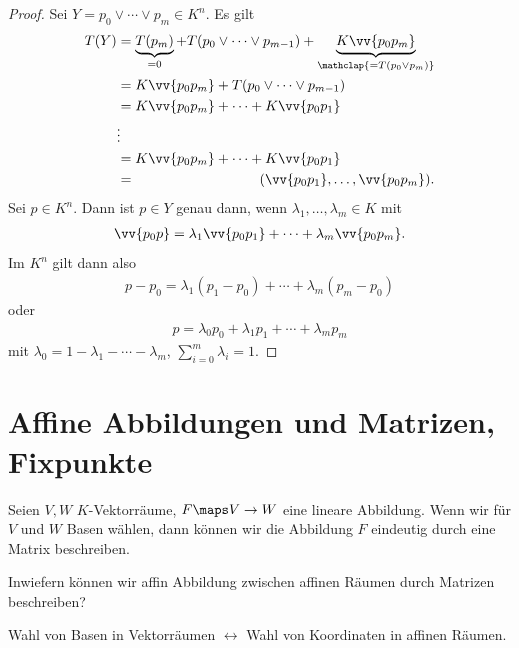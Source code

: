 \begin{proof}
    Sei \( Y=p_0 \vee\dotsb\vee p_m\in K^n \). Es gilt
    \begin{align*}
        T(Y)\begin{aligned}[t]
            &=\underbrace{T(p_m)}_{=0}+T(p_0\vee \dotsb \vee p_{m-1})+\underbrace{K\vv{p_0 p_m}}_{\mathclap{=T(p_0\vee p_m)}}\\
            &=K\vv{p_0 p_m}+T(p_0\vee \dotsb\vee p_{m-1})\\
            &=K\vv{p_0 p_m}+\dotsb +K\vv{p_0 p_1}\\
            &\vdots\\
            &=K\vv{p_0 p_m}+\dotsb + K\vv{p_0 p_1}\\
            &=\span(\vv{p_0 p_1}, \dotsc, \vv{p_0 p_m}).
        \end{aligned}
    \end{align*}
    Sei \( p\in K^n \). Dann ist \( p\in Y \) genau dann, wenn \texists \( \lambda_1,\dotsc,\lambda_m\in K \) mit
    \begin{align*}
        \vv{p_0 p}=\lambda_1 \vv{p_0 p_1}+\dotsb+\lambda_m\vv{p_0 p_m}.
    \end{align*}
    Im \( K^n \) gilt dann also
    \begin{align*}
        p-p_0=\lambda_1(p_1-p_0)+\dotsb + \lambda_m(p_m-p_0)
    \end{align*}
    oder 
    \begin{align*}
        p=\lambda_0 p_0+\lambda_1 p_1+\dotsb+\lambda_m p_m
    \end{align*}
    mit \( \lambda_0=1-\lambda_1-\dotsb-\lambda_m \), \dh \( \sum\limits_{i=0}^{m}\lambda_i=1 \).
\end{proof}
\section{Affine Abbildungen und Matrizen, Fixpunkte}
\begin{motivation*}
    Seien \( V,W \) \( K \)-Vektorräume, \( F\maps V\to W \) eine lineare Abbildung. Wenn wir für \( V \) und \( W \) Basen wählen, dann können wir die Abbildung \( F \) eindeutig durch eine Matrix beschreiben.
\end{motivation*}
\begin{frage*}
    Inwiefern können wir affin Abbildung zwischen affinen Räumen durch Matrizen beschreiben?
\end{frage*}
Wahl von Basen in Vektorräumen \( \leftrightarrow \) Wahl von Koordinaten in affinen Räumen. 

